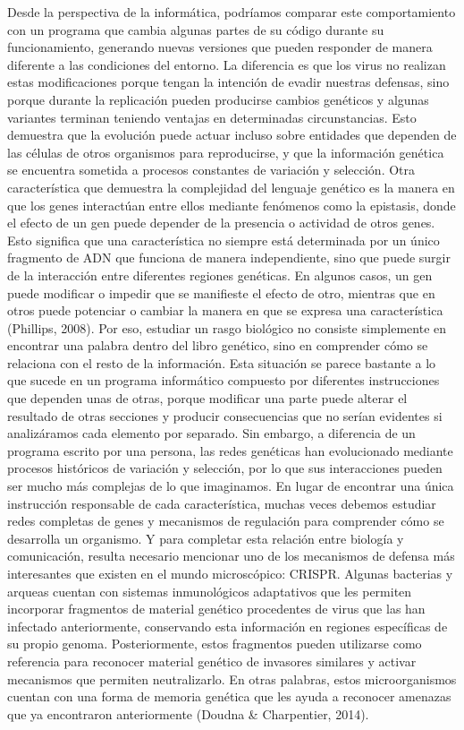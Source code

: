 \documentclass[12pt]{article}
\begin{document}
Desde la perspectiva de la informática, podríamos comparar este comportamiento con un programa que cambia algunas partes de su código durante su funcionamiento, generando nuevas versiones que pueden responder de manera diferente a las condiciones del entorno. La diferencia es que los virus no realizan estas modificaciones porque tengan la intención de evadir nuestras defensas, sino porque durante la replicación pueden producirse cambios genéticos y algunas variantes terminan teniendo ventajas en determinadas circunstancias. Esto demuestra que la evolución puede actuar incluso sobre entidades que dependen de las células de otros organismos para reproducirse, y que la información genética se encuentra sometida a procesos constantes de variación y selección.
Otra característica que demuestra la complejidad del lenguaje genético es la manera en que los genes interactúan entre ellos mediante fenómenos como la epistasis, donde el efecto de un gen puede depender de la presencia o actividad de otros genes. Esto significa que una característica no siempre está determinada por un único fragmento de ADN que funciona de manera independiente, sino que puede surgir de la interacción entre diferentes regiones genéticas. En algunos casos, un gen puede modificar o impedir que se manifieste el efecto de otro, mientras que en otros puede potenciar o cambiar la manera en que se expresa una característica (Phillips, 2008). Por eso, estudiar un rasgo biológico no consiste simplemente en encontrar una palabra dentro del libro genético, sino en comprender cómo se relaciona con el resto de la información.
Esta situación se parece bastante a lo que sucede en un programa informático compuesto por diferentes instrucciones que dependen unas de otras, porque modificar una parte puede alterar el resultado de otras secciones y producir consecuencias que no serían evidentes si analizáramos cada elemento por separado. Sin embargo, a diferencia de un programa escrito por una persona, las redes genéticas han evolucionado mediante procesos históricos de variación y selección, por lo que sus interacciones pueden ser mucho más complejas de lo que imaginamos. En lugar de encontrar una única instrucción responsable de cada característica, muchas veces debemos estudiar redes completas de genes y mecanismos de regulación para comprender cómo se desarrolla un organismo.
Y para completar esta relación entre biología y comunicación, resulta necesario mencionar uno de los mecanismos de defensa más interesantes que existen en el mundo microscópico: CRISPR. Algunas bacterias y arqueas cuentan con sistemas inmunológicos adaptativos que les permiten incorporar fragmentos de material genético procedentes de virus que las han infectado anteriormente, conservando esta información en regiones específicas de su propio genoma. Posteriormente, estos fragmentos pueden utilizarse como referencia para reconocer material genético de invasores similares y activar mecanismos que permiten neutralizarlo. En otras palabras, estos microorganismos cuentan con una forma de memoria genética que les ayuda a reconocer amenazas que ya encontraron anteriormente (Doudna & Charpentier, 2014).
\end{document}
